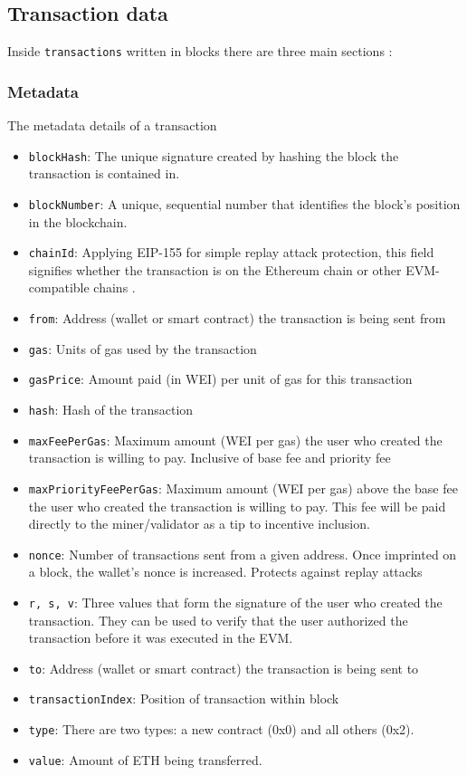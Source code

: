 \documentclass[fleqn,10pt]{olplainarticle}
\begin{document}
\subsection{Transaction data}

Inside \texttt{transactions} written in blocks there are three main sections \cite{kirshner_ethereumTx_2023}:

\subsubsection{Metadata}

The metadata details of a transaction 

\begin{itemize}[noitemsep]
	\item \texttt{blockHash}: The unique signature created by hashing the block the transaction is contained in.
	\item \texttt{blockNumber}: A unique, sequential number that identifies the block's position in the blockchain.
	\item \texttt{chainId}: Applying EIP-155 for simple replay attack protection, this field signifies whether the transaction is on the Ethereum chain or other EVM-compatible chains \cite{buterin_eip155_2016}.
	\item \texttt{from}: Address (wallet or smart contract) the transaction is being sent from
	\item \texttt{gas}: Units of gas used by the transaction
	\item \texttt{gasPrice}: Amount paid (in WEI) per unit of gas for this transaction
	\item \texttt{hash}: Hash of the transaction
	\item \texttt{maxFeePerGas}: Maximum amount (WEI per gas) the user who created the transaction is willing to pay. Inclusive of base fee and priority fee
	\item \texttt{maxPriorityFeePerGas}: Maximum amount (WEI per gas) above the base fee the user who created the transaction is willing to pay. This fee will be paid directly to the miner/validator as a tip to incentive inclusion.
	\item \texttt{nonce}: Number of transactions sent from a given address. Once imprinted on a block, the wallet's nonce is increased. Protects against replay attacks
	\item \texttt{r, s, v}: Three values that form the signature of the user who created the transaction. They can be used to verify that the user authorized the transaction before it was executed in the EVM.
	\item \texttt{to}: Address (wallet or smart contract) the transaction is being sent to
	\item \texttt{transactionIndex}: Position of transaction within block
	\item \texttt{type}: There are two types: a new contract (0x0) and all others (0x2).
	\item \texttt{value}: Amount of ETH being transferred.
\end{itemize}
\end{document}
